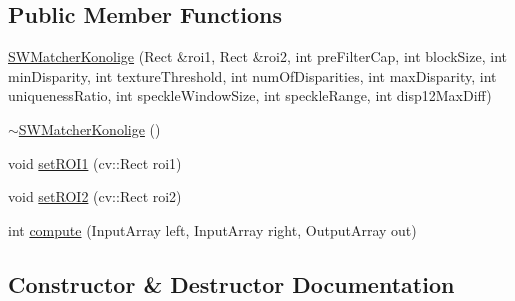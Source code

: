 \subsection*{Public Member Functions}
\begin{DoxyCompactItemize}
\item 
\hyperlink{classSWMatcherKonolige_a3938a2b9d77d4d574bc4296daca7b409}{S\+W\+Matcher\+Konolige} (Rect \&roi1, Rect \&roi2, int pre\+Filter\+Cap, int block\+Size, int min\+Disparity, int texture\+Threshold, int num\+Of\+Disparities, int max\+Disparity, int uniqueness\+Ratio, int speckle\+Window\+Size, int speckle\+Range, int disp12\+Max\+Diff)
\item 
\hyperlink{classSWMatcherKonolige_a038a394f2854a3603c688db0b3f04d7b}{$\sim$\+S\+W\+Matcher\+Konolige} ()
\item 
void \hyperlink{classSWMatcherKonolige_a70a376f1d07da7000ea0a88fc3ab673a}{set\+R\+O\+I1} (cv\+::\+Rect roi1)
\item 
void \hyperlink{classSWMatcherKonolige_a05913005c4d1b5ea6b1bbcb79deef7d0}{set\+R\+O\+I2} (cv\+::\+Rect roi2)
\item 
int \hyperlink{classSWMatcherKonolige_a5df1e9c785130466ae316bae7763864b}{compute} (Input\+Array left, Input\+Array right, Output\+Array out)
\end{DoxyCompactItemize}


\subsection{Constructor \& Destructor Documentation}
